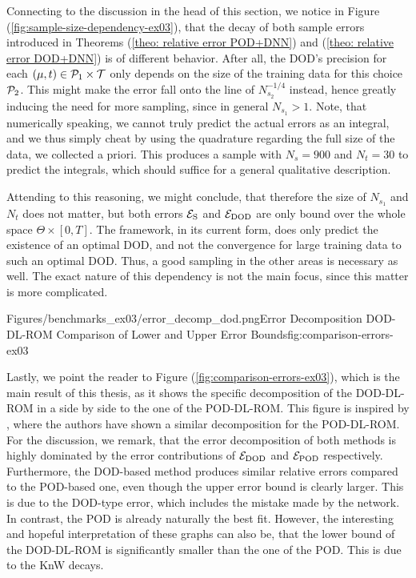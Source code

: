 Connecting to the discussion in the head of this section, we notice in Figure
(\ref{fig:sample-size-dependency-ex03}), that the decay of both sample
errors introduced in Theorems (\ref{theo: relative error POD+DNN}) and (\ref{theo: relative error DOD+DNN})
is of different behavior. After all, the DOD's precision for each $(\mu, t) \in \mathcal{P}_1 \times \mathcal{T}$ only depends
on the size of the training data for this choice $\mathcal{P}_2$. This might make the error
fall onto the line of $N_{s_2}^{-1/4}$ instead, hence greatly inducing the need for more sampling, since
in general $N_{s_1} > 1$. Note, that numerically speaking, we cannot truly predict the actual errors as
an integral, and we thus simply cheat by using the quadrature regarding the full size of the data, we collected a priori.
This produces a sample with $N_s = 900$ and $N_t = 30$ to predict the integrals, which should suffice for
a general qualitative description.

Attending to this reasoning, we might conclude, that therefore the size of 
$N_{s_1}$ and $N_t$ does not matter, but both errors $\mathcal{E}_\text{S}$ and $\mathcal{E}_\text{DOD}$ are
only bound over the whole space $\Theta \times [0, T]$. The framework, in its current form, does only predict the existence
of an optimal DOD, and not the convergence for large training data to such an optimal DOD.
Thus, a good sampling in the other areas is necessary as well.
The exact nature of this dependency is not the main focus, since this matter is more complicated.


%
{Figures/benchmarks_ex03/error_decomp_dod.png}{Error Decomposition DOD-DL-ROM}%
{Comparison of Lower and Upper Error Bounds}{fig:comparison-errors-ex03}

Lastly, we point the reader to Figure (\ref{fig:comparison-errors-ex03}), which is the main result of this thesis,
as it shows the specific decomposition of the DOD-DL-ROM in a side by side to the one of the
POD-DL-ROM. This figure is inspired by \cite{brivio2023}, where the authors have shown a similar decomposition for the POD-DL-ROM. 
For the discussion, we remark, that the error decomposition of both methods is highly dominated by the 
error contributions of $\mathcal{E}_\text{DOD}$ and $\mathcal{E}_\text{POD}$ respectively. Furthermore,
the DOD-based method produces similar relative errors compared to the POD-based one, even though the upper error bound
is clearly larger. This is due to the DOD-type error, which includes the mistake made by the network. In contrast, the POD is
already naturally the best fit. However, the interesting and hopeful interpretation of these graphs
can also be, that the lower bound of the DOD-DL-ROM is significantly smaller than the one of the POD.
This is due to the KnW decays.